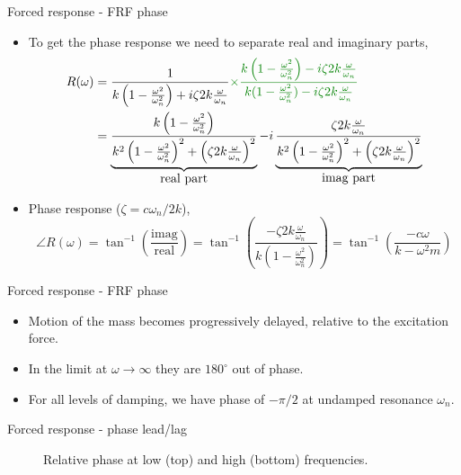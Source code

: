 \documentclass[11pt,aspectratio=169,handout]{beamer}
\begin{document}
\begin{frame}[c]{Forced response - FRF phase}
	\begin{itemize}
		\item<1-> To get the phase response we need to separate real and imaginary parts,
		\begin{align}
			R(\omega)&=  \frac{1}{k\left(1 - \frac{\omega^2}{\omega_n^2}\right) + i \zeta 2 k \frac{\omega}{\omega_n} } {\color{black!50!green}\times \frac{k\left(1 - \frac{\omega^2}{\omega_n^2}\right) - i \zeta 2 k \frac{\omega}{\omega_n} }{k(1 - \frac{\omega^2}{\omega_n^2}) - i \zeta 2 k \frac{\omega}{\omega_n} }}\\
			&=\underbrace{\frac{k\left(1 - \frac{\omega^2}{\omega_n^2}\right)}{k^2\left(1 - \frac{\omega^2}{\omega_n^2}\right)^2 + \left(\zeta 2 k \frac{\omega}{\omega_n}\right)^2 } }_{\mbox{real part}}- i\underbrace{\frac{ \zeta 2 k \frac{\omega}{\omega_n} }{k^2\left(1 - \frac{\omega^2}{\omega_n^2}\right)^2 + \left(\zeta 2 k \frac{\omega}{\omega_n}\right)^2 }}_{\mbox{imag part}}
		\end{align}
	\item<2-> Phase response ($\zeta = c\omega_n/2k$),
	\begin{equation}
		\angle R(\omega) = \tan^{-1}\left( \frac{\mbox{imag}}{\mbox{real}} \right) =\tan^{-1}\left( \frac{-\zeta 2 k \frac{\omega}{\omega_n} }{k\left(1 - \frac{\omega^2}{\omega_n^2}\right)} \right)= \tan^{-1}\left( \frac{-c \omega }{k - \omega^2 m} \right) 
	\end{equation}
	\end{itemize}
\end{frame}


\begin{frame}[c]{Forced response - FRF phase}
	\begin{itemize}
		\item<1-> Motion of the mass becomes progressively delayed, relative to the excitation force. 
		\item<2-> In the limit at $\omega\rightarrow \infty$ they are $180^\circ$ out of phase.
		\item<3-> For all levels of damping, we have phase of $-\pi/2$ at undamped resonance $\omega_n$.
	\end{itemize}
	\begin{figure}
		
	\end{figure}
\end{frame}

\begin{frame}[c]{Forced response - phase lead/lag}
	\begin{figure}
		
		\caption{Relative phase at low (top) and high (bottom) frequencies.}
	\end{figure}
\end{frame}
\end{document}
